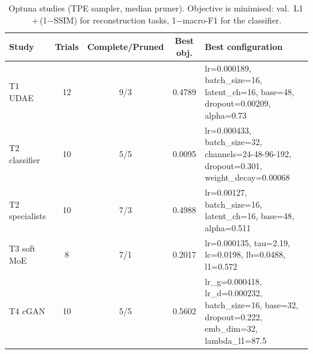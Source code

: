 \begin{table}[t]\centering\caption{Optuna studies (TPE sampler, median pruner). Objective is minimised: val.~L1\,+\,(1$-$SSIM) for reconstruction tasks, 1$-$macro-F1 for the classifier.}\label{tab:optuna}
\small\begin{tabular}{lcccp{10.2cm}}\toprule
Study & Trials & Complete/Pruned & Best obj. & Best configuration\\\midrule
T1 UDAE & 12 & 9/3 & 0.4789 & lr=0.000189, batch\_size=16, latent\_ch=16, base=48, dropout=0.00209, alpha=0.73\\
T2 classifier & 10 & 5/5 & 0.0095 & lr=0.000433, batch\_size=32, channels=24-48-96-192, dropout=0.301, weight\_decay=0.00068\\
T2 specialists & 10 & 7/3 & 0.4988 & lr=0.00127, batch\_size=16, latent\_ch=16, base=48, alpha=0.511\\
T3 soft MoE & 8 & 7/1 & 0.2017 & lr=0.000135, tau=2.19, lc=0.0198, lb=0.0488, l1=0.572\\
T4 cGAN & 10 & 5/5 & 0.5602 & lr\_g=0.000418, lr\_d=0.000232, batch\_size=16, base=32, dropout=0.222, emb\_dim=32, lambda\_l1=87.5\\
\bottomrule\end{tabular}\end{table}